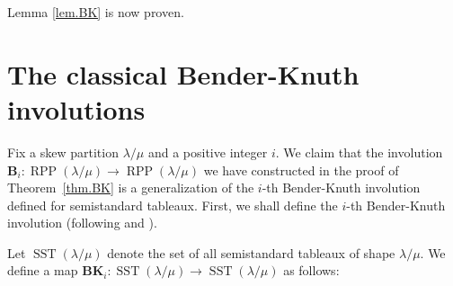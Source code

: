 \documentclass[numbers=enddot,12pt,final,onecolumn,notitlepage]{scrartcl}%
\theoremstyle{definition}
\def\lm{{\lambda/\mu}}
\begin{document}
Lemma \ref{lem.BK} is now proven.

\section{\label{sect.BKclassical}The classical Bender-Knuth involutions}

\def\BK{{\mathbf{BK}}}

Fix a skew partition $\lambda/\mu$ and a positive integer $i$.
We claim that the involution $\mathbf{B}_{i}:\operatorname*{RPP}\left(
\lambda/\mu\right)  \rightarrow\operatorname*{RPP}\left(  \lambda/\mu\right)
$ we have constructed in the proof of Theorem~\ref{thm.BK}
is a generalization of the $i$-th Bender-Knuth involution defined for
semistandard tableaux. First, we shall
define the $i$-th Bender-Knuth involution (following \cite[proof of
Proposition 2.11]{GriRei15} and \cite[proof of Theorem 7.10.2]{Stan99}).

Let $\operatorname*{SST}\left(  \lambda/\mu\right)  $ denote the set of all
semistandard tableaux of shape $ \lm$. We define a
map $\BK_{i}:\operatorname*{SST}\left(  \lambda/\mu\right)  \rightarrow
\operatorname*{SST}\left(  \lambda/\mu\right)  $ as follows:
\end{document}

